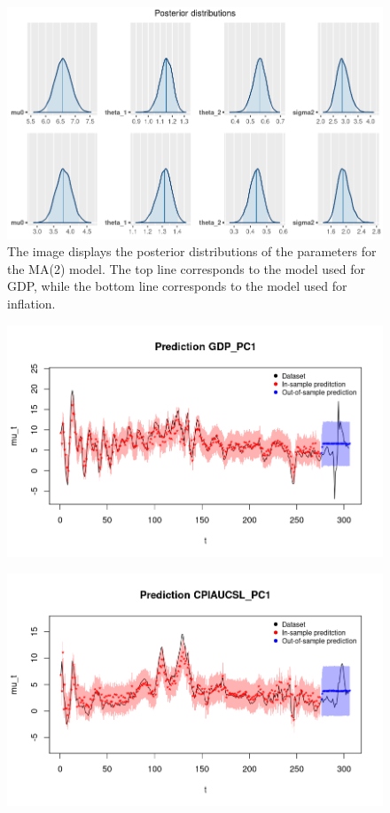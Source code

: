 \begin{figure}[h]
    \centering
    \includegraphics[width=\textwidth]{images/3-MA/posteriors2.png}
    \caption{The image displays the posterior distributions of the parameters for the MA(2) model. The top line corresponds to the model used for GDP, while the bottom line corresponds to the model used for inflation.}
    \label{fig:MA2_posteriors}
\end{figure}

\begin{figure}[h]
    \centering
    \includegraphics[width=\textwidth]{images/3-MA/gdp_prediction2.png}
    \label{fig:MA2_first}
\end{figure}
\begin{figure}[h]
    \centering
    \includegraphics[width=\textwidth]{images/3-MA/infl_prediction2.png}
    \label{fig:MA2_second}
\end{figure}
